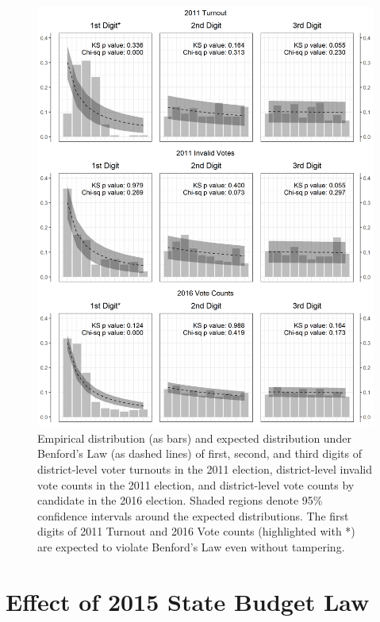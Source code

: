 \documentclass[12pt]{article}
\newcommand{\1}{\mathbbm{1}}
\begin{document}
\begin{figure}[!htbp]
	\centering
	\includegraphics[height=.85\textheight]{figure/190716_digit_test.png}
	\caption[Digit Test of Election Results]{Empirical distribution (as bars) and expected distribution under Benford's Law (as dashed lines) of first, second, and third digits of district-level voter turnouts in the 2011 election, district-level invalid vote counts in the 2011 election, and district-level vote counts by candidate in the 2016 election. Shaded regions denote 95\% confidence intervals around the expected distributions. The first digits of 2011 Turnout and 2016 Vote counts (highlighted with \textsf{*}) are expected to violate Benford's Law even without tampering.}
	\label{fig:Benford}
\end{figure}

\clearpage

\section{Effect of 2015 State Budget Law}
\label{app:budget_law}
\end{document}
